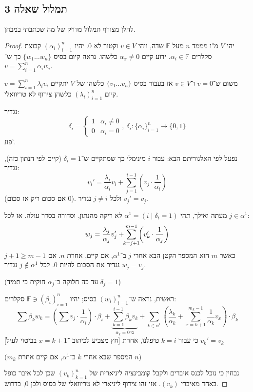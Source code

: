 \documentclass[]{article}
\newcommand\F         {\mathbb{F}}
\newcommand\co        {\colon}
\newcommand\ag        {\alpha}
\newcommand\bg        {\beta}
\newcommand\dg        {\delta}
\renewcommand\lg      {\lambda}
\newcommand\cl [1]    {\left ( #1 \right )}
\theoremstyle{definition}
\begin{document}
	\subsection*{תמלול שאלה 3}
	להלן מצורף תמלול מדויק של מה שכתבתי במבחן. 
	
	\begin{proof}
		יהי $V$ מ"ו מממד $n$ מעל $\F$ שדה, ויהי $v \in V$ וקטור לא $0$. יהיו $(\ag_i)_{i = 1}^{n}$ קבוצת סקלרים $\ag_i \in \F$. ידוע קיים $\ag_x \neq 0$ כלשהו. נראה קיום בסיס $\{w_1 \dots w_n\}$ כך ש־$v = \sum_{i = 1}^{n} \ag_i w_i$. 
		
		משום ש־$v = 0$ ו־$v \in V$ אז בעבור בסיס $\{v_1 \dots v_n\}$ כלשהו של $V$ יתקיים $v = \sum_{i = 1}^{n}\lg_iv_i$ קיום $(\lg_i)_{i = 1}^{n}$ כלשהן צירוף לא טריוואלי. 
		
		נגדיר: 
		\[ \dg_i = \begin{cases}
			1 & \ag_i \neq 0 \\
			0 & \ag_i = 0
		\end{cases}, \ \dg_i \co \{\ag_i\}^{n}_{i = 1} \to \{0, 1\} \]
		פונ'.
		
		נפעל לפי האלגוריתם הבא: עבור $i$ מינימלי כך שמתקיים ש־$\dg_i = 1$ (קיים לפי הנתון כזה), נגדיר: 
		\[ v_i' = \frac{\lg_i}{\ag_i} v_i + \sum_{j = 1}^{i - 1}\cl{v_j \cdot \frac{1}{\ag_i}} \]
		(אם סכום ריק אז סכום $0$). ולכל $j \neq i$ נגדיר $v_j' = v_j$. 
		
		מעתה ואילך, תהי $\ag^1 = (i \mid \dg_i = 1)$ לא ריקה מהנתון, וסדורה בסדר עולה. אז לכל $j \in \ag^1$: 
		\[ w_j = \frac{\lg_j}{\ag_j}v_j' + \sum_{\mathclap{k = j + 1}}^{m - 1}\cl{v_k' \cdot \frac{1}{\ag_j}} \]
		כאשר $m$ הוא המספר הקטן הבא אחרי $j$ ב־$\ag^1$, אם קיים, אחרת $n$. 
		אם $j + 1 \ge m -1$ נגדיר את הסכום להיות 0. לכל $j \notin \ag^1$ נגדיר $w_j = v_j$. 
		
		(עד כה חלוקה ב־$\ag_j$ חוקית כי תמיד $\dg_j = 1$)
		
		ראשית, נראה ש־$(w_i)_{i = 1}^{n}$ בסיס; יהיו $\F \ni (\bg_i)_{i = 1}^{n}$ סקלרים: 
		\[ \sum \bg_k w_k = \cl{\sum v_j \cdot \frac{1}{\ag_i}} \cdot \bg_i
		+ \underbrace{\sum_{k = 1}^{i - 1}\bg_k v_k}_{\ag_k = 0\, \text{כי}}
		+ \sum_{k \in \ag^1} \cl{\frac{\lg_k}{\ag_k} + \sum_{x = k + 1}^{m_k - 1} \frac{1}{\ag_k}v_x} \cdot \bg_k \]
		[חץ מצביע לכיתוב ־$x = k + 1$ בביטוי לעיל] כי עבור $k = i$ טיפלנו, אחרת $v_k' = v_k$
		
		($m_k$ המספר שבא אחרי $k$ ב־$\ag^1$, אם קיים אחרת $n$)
		
		נבחין כי נוכל לכנס איברים ולקבל קומבינציה ליניארית של $(v_k)_{k = 1}^{n}$ שכן לכל איבר כופל באחד מאיברי $(v_k)$. אזי זהו צירוף ליניארי לא טריוואלי של בסיס ולכן $0$, כדרוש. 
		

\end{proof}
\end{document}
